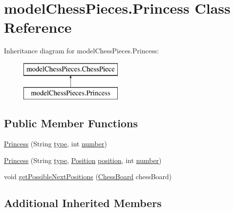 \hypertarget{classmodel_chess_pieces_1_1_princess}{\section{model\+Chess\+Pieces.\+Princess Class Reference}
\label{classmodel_chess_pieces_1_1_princess}
}
Inheritance diagram for model\+Chess\+Pieces.\+Princess\+:\begin{figure}[H]
\begin{center}
\leavevmode
\includegraphics[height=2.000000cm]{classmodel_chess_pieces_1_1_princess}
\end{center}
\end{figure}
\subsection*{Public Member Functions}
\begin{DoxyCompactItemize}
\item 
\hyperlink{classmodel_chess_pieces_1_1_princess_a33cb1197bcb1f8808ea931626f2cf90b}{Princess} (String \hyperlink{classmodel_chess_pieces_1_1_chess_piece_a195487ca88c197af7c1604247be31db2}{type}, int \hyperlink{classmodel_chess_pieces_1_1_chess_piece_a979e63b99128333883acedc38d25dc87}{number})
\item 
\hyperlink{classmodel_chess_pieces_1_1_princess_a4c6de589407a7e236d78a89cffd41b97}{Princess} (String \hyperlink{classmodel_chess_pieces_1_1_chess_piece_a195487ca88c197af7c1604247be31db2}{type}, \hyperlink{classmodel_core_1_1_position}{Position} \hyperlink{classmodel_chess_pieces_1_1_chess_piece_a3d4362d5b28f6edb14161196d9c6807d}{position}, int \hyperlink{classmodel_chess_pieces_1_1_chess_piece_a979e63b99128333883acedc38d25dc87}{number})
\item 
void \hyperlink{classmodel_chess_pieces_1_1_princess_a519aa023aeb5b6c683e2251fd434efb0}{get\+Possible\+Next\+Positions} (\hyperlink{classmodel_core_1_1_chess_board}{Chess\+Board} chess\+Board)
\end{DoxyCompactItemize}
\subsection*{Additional Inherited Members}


